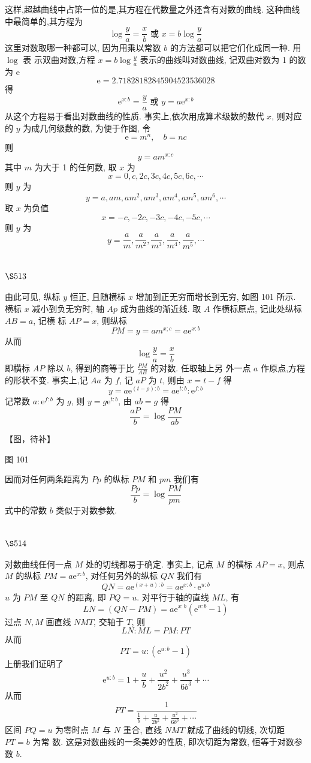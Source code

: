这样,超越曲线中占第一位的是,其方程在代数量之外还含有对数的曲线. 这种曲线 中最简单的,其方程为
\[
\log \frac{y}{a}=\frac{x}{b} \text { 或 } x=b \log \frac{y}{a}
\]
这里对数取哪一种都可以, 因为用乘以常数 $b$ 的方法都可以把它们化成同一种. 用 $\log$ 表 示双曲对数,方程 $x=b \log \frac{y}{a}$ 表示的曲线叫对数曲线, 记双曲对数为 1 的数为 $\mathrm{e}$
\[
\mathrm{e}=2.71828182845904523536028
\]
得
\[
\mathrm{e}^{x: b}=\frac{y}{a} \text { 或 } y=a \mathrm{e}^{x: b}
\]
从这个方程易于看出对数曲线的性质. 事实上,依次用成算术级数的数代 $x$, 则对应的 $y$ 为成几何级数的数, 为便于作图, 令
\[
\mathrm{e}=m^{n}, \quad b=n c
\]
则
\[
y=a m^{x: c}
\]
其中 $m$ 为大于 1 的任何数, 取 $x$ 为
\[
x=0, c, 2 c, 3 c, 4 c, 5 c, 6 c, \cdots
\]
则 $y$ 为
\[
y=a, a m, a m^{2}, a m^{3}, a m^{4}, a m^{5}, a m^{6}, \cdots
\]
取 $x$ 为负值
\[
x=-c,-2 c,-3 c,-4 c,-5 c, \cdots
\]
则 $y$ 为
\[
y=\frac{a}{m}, \frac{a}{m^{2}}, \frac{a}{m^{3}}, \frac{a}{m^{4}}, \frac{a}{m^{5}}, \cdots
\]
\section{$\S 513$}

由此可见, 纵标 $y$ 恒正, 且随横标 $x$ 增加到正无穷而增长到无穷, 如图 101 所示. 横标 $x$ 减小到负无穷时, 轴 $A p$ 成为曲线的渐近线. 取 $A$ 作横标原点, 记此处纵标 $A B=a$, 记横 标 $A P=x$, 则纵标 
\[
P M=y=a m^{x ; c}=a \mathrm{e}^{x: b}
\]
从而
\[
\log \frac{y}{a}=\frac{x}{b}
\]
即横标 $A P$ 除以 $b$, 得到的商等于比 $\frac{P M}{A B}$ 的对数. 任取轴上另 外一点 $a$ 作原点,方程的形状不变. 事实上,记 $A a$ 为 $f$, 记 $a P$ 为 $t$, 则由 $x=t-f$ 得
\[
y=a \mathrm{e}^{(t-\rho): b}=a \mathrm{e}^{t: b}: \mathrm{e}^{f: b}
\]
记常数 $a: \mathrm{e}^{f: b}$ 为 $g$, 则 $y=g \mathrm{e}^{t: b}$, 由 $a b=g$ 得
\[
\frac{a P}{b}=\log \frac{P M}{a b}
\]

【图，待补】

图 101

因而对任何两条距离为 $P p$ 的纵标 $P M$ 和 $p m$ 我们有
\[
\frac{P p}{b}=\log \frac{P M}{p m}
\]
式中的常数 $b$ 类似于对数参数.

\section{$\S 514$}

对数曲线任何一点 $M$ 处的切线都易于确定. 事实上, 记点 $M$ 的横标 $A P=x$, 则点 $M$ 的纵标 $P M=a \mathrm{e}^{x: b}$, 对任何另外的纵标 $Q N$ 我们有
\[
Q N=a \mathrm{e}^{(x+u): b}=a \mathrm{e}^{x: b} \cdot \mathrm{e}^{u: b}
\]
$u$ 为 $P M$ 至 $Q N$ 的距离, 即 $P Q=u$. 对平行于轴的直线 $M L$, 有
\[
L N=(Q N-P M)=a \mathrm{e}^{x: b}\left(\mathrm{e}^{u: b}-1\right)
\]
过点 $N, M$ 画直线 $N M T$, 交轴于 $T$, 则
\[
L N: M L=P M: P T
\]
从而
\[
P T=u:\left(\mathrm{e}^{u: b}-1\right)
\]
上册我们证明了
\[
\mathrm{e}^{u: b}=1+\frac{u}{b}+\frac{u^{2}}{2 b^{2}}+\frac{u^{3}}{6 b^{3}}+\cdots
\]
从而
\[
P T=\frac{1}{\frac{1}{b}+\frac{u}{2 b^{2}}+\frac{u^{2}}{6 b^{3}}+\cdots}
\]
区间 $P Q=u$ 为零时点 $M$ 与 $N$ 重合, 直线 $N M T$ 就成了曲线的切线, 次切距 $P T=b$ 为常 数. 这是对数曲线的一条美妙的性质, 即次切距为常数, 恒等于对数参数 $b$.

